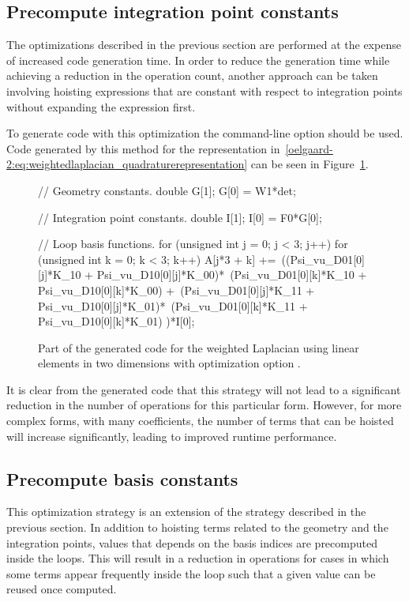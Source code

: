 \subsection{Precompute integration point constants}

The optimizations described in the previous section are performed at
the expense of increased code generation time.  In order to reduce the
generation time while achieving a reduction in the operation count,
another approach can be taken involving hoisting expressions that are
constant with respect to integration points without expanding the
expression first.

To generate code with this optimization the \ffc{} command-line option
 should be used.  Code generated by this
method for the representation
in~\eqref{oelgaard-2:eq:weightedlaplacian_quadraturerepresentation}
can be seen in Figure~\ref{oelgaard-2:fig:O_ip_code}.

\begin{figure}
\begin{c++}
// Geometry constants.
double G[1];
G[0] = W1*det;

// Integration point constants.
double I[1];
I[0] = F0*G[0];

// Loop basis functions.
for (unsigned int j = 0; j < 3; j++)
{
  for (unsigned int k = 0; k < 3; k++)
  {
    A[j*3 + k] +=\
    ((Psi_vu_D01[0][j]*K_10 + Psi_vu_D10[0][j]*K_00)*\
     (Psi_vu_D01[0][k]*K_10 + Psi_vu_D10[0][k]*K_00) +\
     (Psi_vu_D01[0][j]*K_11 + Psi_vu_D10[0][j]*K_01)*\
     (Psi_vu_D01[0][k]*K_11 + Psi_vu_D10[0][k]*K_01)
    )*I[0];
  }
}
\end{c++}
\caption{Part of the generated code for the weighted Laplacian using
  linear elements in two dimensions with optimization option .}
\label{oelgaard-2:fig:O_ip_code}
\end{figure}

It is clear from the generated code that this strategy will not lead
to a significant reduction in the number of operations for this
particular form. However, for more complex forms, with many
coefficients, the number of terms that can be hoisted will increase
significantly, leading to improved runtime performance.

\subsection{Precompute basis constants}

This optimization strategy is an extension of the strategy described
in the previous section. In addition to hoisting terms related to the
geometry and the integration points, values that depends on the basis
indices are precomputed inside the loops.  This will result in a
reduction in operations for cases in which some terms appear
frequently inside the loop such that a given value can be reused once
computed.

